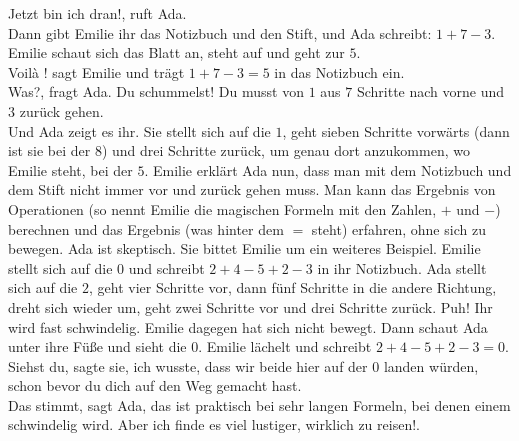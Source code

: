 \frqq{}Jetzt bin ich dran!\flqq{}, ruft Ada.\\
Dann gibt Emilie ihr das Notizbuch und den Stift, und Ada schreibt: $1 + 7 - 3$. Emilie schaut sich das Blatt an, steht auf und geht zur $5$.\\
\frqq{}Voilà !\flqq{} sagt Emilie und trägt $1 + 7 - 3 = 5$ in das Notizbuch ein.\\
\frqq{}Was?\flqq{}, fragt Ada. \frqq{}Du schummelst! Du musst von $1$ aus $7$ Schritte nach vorne und $3$ zurück gehen.\flqq{}\\
Und Ada zeigt es ihr. Sie stellt sich auf die $1$, geht sieben Schritte vorwärts (dann ist sie bei der $8$) und drei Schritte zurück, um genau dort anzukommen, wo Emilie steht, bei der $5$. Emilie erklärt Ada nun, dass man mit dem Notizbuch und dem Stift nicht immer vor und zurück gehen muss. Man kann das Ergebnis von Operationen (so nennt Emilie die magischen Formeln mit den Zahlen, $+$ und $-$) berechnen und das Ergebnis (was hinter dem $=$ steht) erfahren, ohne sich zu bewegen. Ada ist skeptisch. Sie bittet Emilie um ein weiteres Beispiel. Emilie stellt sich auf die $0$ und schreibt $2 + 4 - 5 + 2 - 3$ in ihr Notizbuch. Ada stellt sich auf die $2$, geht vier Schritte vor, dann fünf Schritte in die andere Richtung, dreht sich wieder um, geht zwei Schritte vor und drei Schritte zurück. Puh! Ihr wird fast schwindelig. Emilie dagegen hat sich nicht bewegt. Dann schaut Ada unter ihre Füße und sieht die $0$. Emilie lächelt und schreibt $2 + 4 - 5 + 2 - 3 = 0$.\\
\frqq{}Siehst du\flqq{}, sagte sie, \frqq{}ich wusste, dass wir beide hier auf der $0$ landen würden, schon bevor du dich auf den Weg gemacht hast.\flqq{}\\
\frqq{}Das stimmt\flqq{}, sagt Ada, \frqq{}das ist praktisch bei sehr langen Formeln, bei denen einem schwindelig wird. Aber ich finde es viel lustiger, wirklich zu reisen!\flqq{}.
